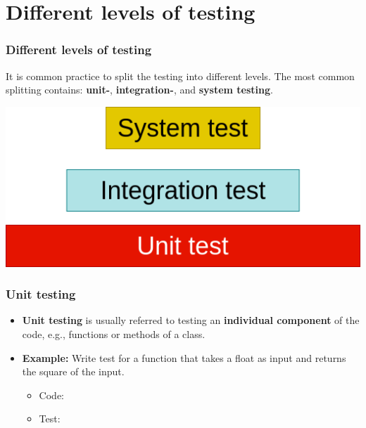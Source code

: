 \documentclass[9pt,xcolor=dvipsnames]{beamer}
\begin{document}
\section{Different levels of testing}
\begin{frame}
  \frametitle{Different levels of testing}
  It is common practice to split the testing into different
  levels. The most common splitting contains: \textbf{unit-}, \textbf{integration-}, and
  \textbf{system testing}.
  \vspace{1cm}
  \begin{center}
    \includegraphics[scale=0.3]{figs/levels.png}
  \end{center}
\end{frame}

\begin{frame}
  \frametitle{Unit testing}
  \begin{itemize}
    \item \textbf{Unit testing} is usually referred to testing an
      \textbf{individual component} of the code, e.g., functions or methods of a class.
    \item \textbf{Example:} Write test for a function that takes a float as
      input and returns the square of the input.
      \pause
      \begin{itemize} 
      \item Code:
        
        \pause
      \item Test:
        
      \end{itemize}
  \end{itemize}
\end{frame}
\end{document}
